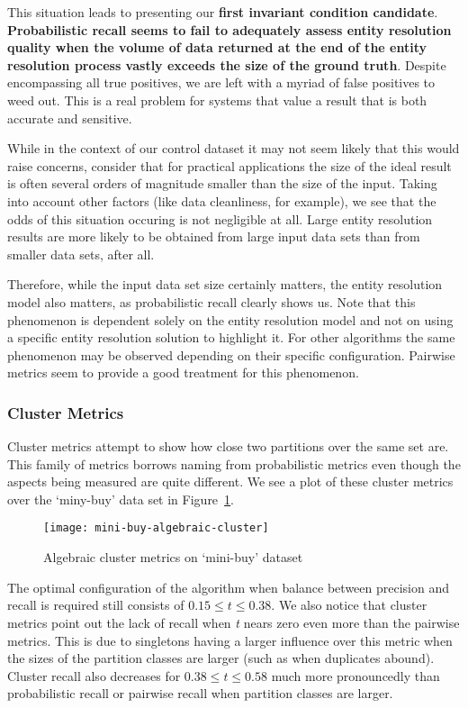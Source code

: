 This situation leads to presenting our \textbf{first invariant condition
candidate}.
\textbf{Probabilistic recall seems to fail to adequately assess entity
resolution quality when the volume of data returned at the end of the entity
resolution process vastly exceeds the size of the ground truth}.
Despite encompassing all true positives, we are left with a myriad of false
positives to weed out.
This is a real problem for systems that value a result that is both accurate and
sensitive.

While in the context of our control dataset it may not seem likely that this
would raise concerns, consider that for practical applications the size of the
ideal result is often several orders of magnitude smaller than the size of the
input.
Taking into account other factors (like data cleanliness, for example), we see
that the odds of this situation occuring is not negligible at all.
Large entity resolution results are more likely to be obtained from large input
data sets than from smaller data sets, after all.

Therefore, while the input data set size certainly matters, the entity
resolution model also matters, as probabilistic recall clearly shows us.
Note that this phenomenon is dependent solely on the entity resolution model and
not on using a specific entity resolution solution to highlight it.
For other algorithms the same phenomenon may be observed depending on their
specific configuration.
Pairwise metrics seem to provide a good treatment for this phenomenon.

\subsubsection{Cluster Metrics}\label{subsubsec:Cluster Results}

Cluster metrics attempt to show how close two partitions over the same set are.
This family of metrics borrows naming from probabilistic metrics even though
the aspects being measured are quite different.
We see a plot of these cluster metrics over the `miny-buy' data set in
Figure~\ref{fig:mini-alg-cluster}.

\begin{figure}[htbp]
    \centering
    \captionsetup{justification=centering}
    \texttt{[image: mini-buy-algebraic-cluster]}
    \caption{Algebraic cluster metrics on `mini-buy' dataset}\label{fig:mini-alg-cluster}
\end{figure}

The optimal configuration of the algorithm when balance between precision and
recall is required still consists of $0.15 \le t \le 0.38$.
We also notice that cluster metrics point out the lack of recall when \textit{t}
nears zero even more than the pairwise metrics.
This is due to singletons having a larger influence over this metric when the
sizes of the partition classes are larger (such as when duplicates abound).
Cluster recall also decreases for $0.38 \le t \le 0.58$ much more pronouncedly
than probabilistic recall or pairwise recall when partition classes are larger.

